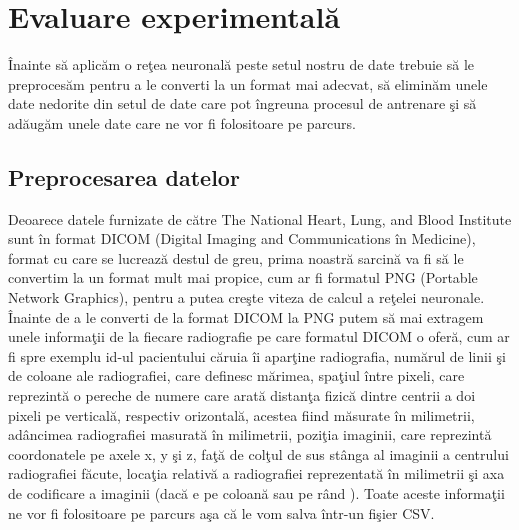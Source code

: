 \chapter{Evaluare experimental\u{a}}

\^{I}nainte s\u{a} aplic\u{a}m o re\c{t}ea neuronal\u{a} peste setul nostru de date trebuie s\u{a} le preproces\u{a}m pentru a le converti la un format mai adecvat, s\u{a} elimin\u{a}m unele date nedorite din setul de date care pot \^{i}ngreuna procesul de antrenare \c{s}i s\u{a} ad\u{a}ug\u{a}m unele date care ne vor fi folositoare pe parcurs.

\section{Preprocesarea datelor}

Deoarece datele furnizate de c\u{a}tre The National Heart, Lung, and Blood Institute sunt \^{i}n format DICOM (Digital Imaging and Communications \^{i}n Medicine), format cu care se lucreaz\u{a} destul de greu, prima noastr\u{a} sarcin\u{a} va fi s\u{a} le convertim la un format mult mai propice, cum ar fi formatul PNG (Portable Network Graphics), pentru a putea cre\c{s}te viteza de calcul a re\c{t}elei neuronale. \^{I}nainte de a le converti de la format DICOM la PNG putem s\u{a} mai extragem unele informa\c{t}ii de la fiecare radiografie pe care formatul DICOM o ofer\u{a}, cum ar fi spre exemplu  id-ul pacientului c\u{a}ruia \^{i}i apar\c{t}ine radiografia, num\u{a}rul de linii \c{s}i de coloane ale radiografiei, care definesc m\u{a}rimea, spa\c{t}iul \^{i}ntre pixeli, care reprezint\u{a} o pereche de numere care arat\u{a} distan\c{t}a fizic\u{a} dintre centrii a doi pixeli pe vertical\u{a}, respectiv orizontal\u{a}, acestea fiind m\u{a}surate \^{i}n milimetrii, ad\^{a}ncimea radiografiei masurat\u{a} \^{i}n milimetrii, pozi\c{t}ia imaginii, care reprezint\u{a} coordonatele pe axele x, y \c{s}i z, fa\c{t}\u{a} de col\c{t}ul de sus st\^{a}nga al imaginii a centrului  radiografiei f\u{a}cute, loca\c{t}ia relativ\u{a} a radiografiei reprezentat\u{a} \^{i}n milimetrii \c{s}i axa de codificare a imaginii (dac\u{a} e pe coloan\u{a} sau pe r\^{a}nd ). Toate aceste informa\c{t}ii ne vor fi folositoare pe parcurs a\c{s}a c\u{a} le vom salva \^{i}ntr-un fi\c{s}ier CSV.

\par


